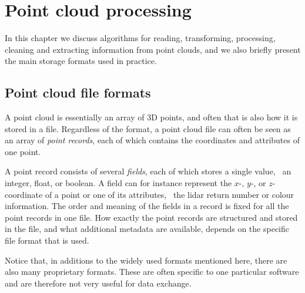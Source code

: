 
\graphicspath{{pcprocessing/}}

\chapter{Point cloud processing}
\label{chap:pcprocessing}

In this chapter we discuss algorithms for reading, transforming, processing, cleaning and extracting information from point clouds, and we also briefly present the main storage formats used in practice.



%
\section{Point cloud file formats}

A point cloud is essentially an array of 3D points, and often that is also how it is stored in a file.
Regardless of the format, a point cloud file can often be seen as an array of \emph{point records}, each of which contains the coordinates and attributes of one point.

A point record consists of several \emph{fields}, each of which stores a single value, \eg\ an integer, float, or boolean.
A field can for instance represent the $x$-, $y$-, or $z$-coordinate of a point or one of its attributes, \eg\ the lidar return number or colour information.
The order and meaning of the fields in a record is fixed for all the point records in one file.
How exactly the point records are structured and stored in the file, and what additional metadata are available, depends on the specific file format that is used.

Notice that, in additions to the widely used formats mentioned here, there are also many proprietary formats. These are often specific to one particular software and are therefore not very useful for data exchange.

